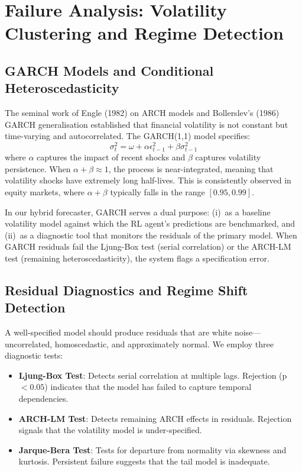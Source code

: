 \documentclass[conference]{IEEEtran}
\begin{document}
\section{Failure Analysis: Volatility Clustering and Regime Detection}

\subsection{GARCH Models and Conditional Heteroscedasticity}
The seminal work of Engle (1982) on ARCH models and Bollerslev's (1986) GARCH generalisation established that financial volatility is not constant but time-varying and autocorrelated. The GARCH(1,1) model specifies:
\begin{equation}
\sigma_t^2 = \omega + \alpha \epsilon_{t-1}^2 + \beta \sigma_{t-1}^2
\end{equation}
where $\alpha$ captures the impact of recent shocks and $\beta$ captures volatility persistence. When $\alpha + \beta \approx 1$, the process is near-integrated, meaning that volatility shocks have extremely long half-lives. This is consistently observed in equity markets, where $\alpha + \beta$ typically falls in the range $[0.95, 0.99]$.

In our hybrid forecaster, GARCH serves a dual purpose: (i)~as a baseline volatility model against which the RL agent's predictions are benchmarked, and (ii)~as a diagnostic tool that monitors the residuals of the primary model. When GARCH residuals fail the Ljung-Box test (serial correlation) or the ARCH-LM test (remaining heteroscedasticity), the system flags a specification error.

\subsection{Residual Diagnostics and Regime Shift Detection}
A well-specified model should produce residuals that are white noise---uncorrelated, homoscedastic, and approximately normal. We employ three diagnostic tests:
\begin{itemize}[nosep]
    \item \textbf{Ljung-Box Test}: Detects serial correlation at multiple lags. Rejection (p $< 0.05$) indicates that the model has failed to capture temporal dependencies.
    \item \textbf{ARCH-LM Test}: Detects remaining ARCH effects in residuals. Rejection signals that the volatility model is under-specified.
    \item \textbf{Jarque-Bera Test}: Tests for departure from normality via skewness and kurtosis. Persistent failure suggests that the tail model is inadequate.
\end{itemize}
\end{document}

